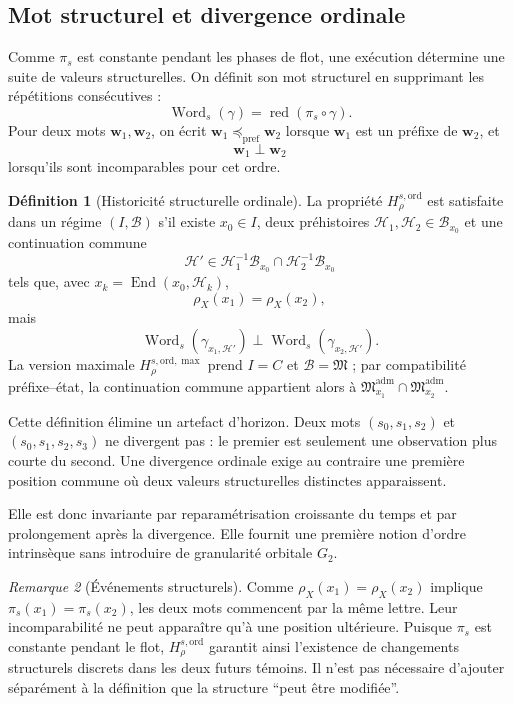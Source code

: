 \documentclass[11pt,a4paper]{article}
\theoremstyle{definition}
\newtheorem{definition}{Définition}[section]
\theoremstyle{remark}
\newtheorem{remark}[definition]{Remarque}
\newcommand{\M}{\mathfrak M}
\newcommand{\Madm}{\mathfrak M^{\mathrm{adm}}}
\newcommand{\End}{\operatorname{End}}
\newcommand{\Word}{\operatorname{Word}}
\begin{document}
\subsection{Mot structurel et divergence ordinale}

Comme $\pi_s$ est constante pendant les phases de flot, une exécution détermine une suite de valeurs structurelles. On définit son mot structurel en supprimant les répétitions consécutives :
\[
\Word_s(\gamma)=\operatorname{red}(\pi_s\circ\gamma).
\]
Pour deux mots $\mathbf w_1,\mathbf w_2$, on écrit $\mathbf w_1\preceq_{\mathrm{pref}}\mathbf w_2$ lorsque $\mathbf w_1$ est un préfixe de $\mathbf w_2$, et
\[
\mathbf w_1\perp\mathbf w_2
\]
lorsqu'ils sont incomparables pour cet ordre.

\begin{definition}[Historicité structurelle ordinale]
La propriété $H_{\rho}^{s,\mathrm{ord}}$ est satisfaite dans un régime $(I,\mathcal B)$ s'il existe $x_0\in I$, deux préhistoires $\mathcal H_1,\mathcal H_2\in\mathcal B_{x_0}$ et une continuation commune
\[
\mathcal H'\in\mathcal H_1^{-1}\mathcal B_{x_0}\cap\mathcal H_2^{-1}\mathcal B_{x_0}
\]
tels que, avec $x_k=\End(x_0,\mathcal H_k)$,
\[
\rho_X(x_1)=\rho_X(x_2),
\]
mais
\[
\boxed{
\Word_s(\gamma_{x_1,\mathcal H'})
\perp
\Word_s(\gamma_{x_2,\mathcal H'}).}
\]
La version maximale $H_{\rho}^{s,\mathrm{ord},\max}$ prend $I=C$ et $\mathcal B=\M$ ; par compatibilité préfixe--état, la continuation commune appartient alors à $\Madm_{x_1}\cap\Madm_{x_2}$.
\end{definition}

Cette définition élimine un artefact d'horizon. Deux mots $(s_0,s_1,s_2)$ et $(s_0,s_1,s_2,s_3)$ ne divergent pas : le premier est seulement une observation plus courte du second. Une divergence ordinale exige au contraire une première position commune où deux valeurs structurelles distinctes apparaissent.

Elle est donc invariante par reparamétrisation croissante du temps et par prolongement après la divergence. Elle fournit une première notion d'ordre intrinsèque sans introduire de granularité orbitale $G_2$.

\begin{remark}[Événements structurels]
Comme $\rho_X(x_1)=\rho_X(x_2)$ implique $\pi_s(x_1)=\pi_s(x_2)$, les deux mots commencent par la même lettre. Leur incomparabilité ne peut apparaître qu'à une position ultérieure. Puisque $\pi_s$ est constante pendant le flot, $H_{\rho}^{s,\mathrm{ord}}$ garantit ainsi l'existence de changements structurels discrets dans les deux futurs témoins. Il n'est pas nécessaire d'ajouter séparément à la définition que la structure ``peut être modifiée''.
\end{remark}
\end{document}
